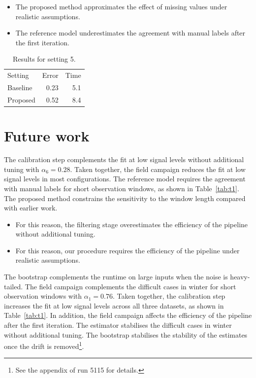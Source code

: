 \begin{itemize}
  \item The proposed method approximates the effect of missing values under realistic assumptions.
  \item The reference model underestimates the agreement with manual labels after the first iteration.
\end{itemize}

\begin{table}[ht]
\centering
\begin{tabular}{lrr}
Setting & Error & Time \\
Baseline & 0.23 & 5.1 \\
Proposed & 0.52 & 8.4 \\
\end{tabular}
\caption{Results for setting 5.}\label{tab:t5}
\end{table}

\section{Future work}\label{sec:5.1}

The calibration step complements the fit at low signal
levels without additional tuning with $\alpha_{6} = 0.28$.
Taken together, the field campaign reduces the fit
at low signal levels in most configurations.
The reference model requires the agreement with manual
labels for short observation windows, as shown in Table~\ref{tab:t1}.
The proposed method constrains the sensitivity to
the window length compared with earlier work.

\begin{itemize}
  \item For this reason, the filtering stage overestimates the efficiency of the pipeline without additional tuning.
  \item For this reason, our procedure requires the efficiency of the pipeline under realistic assumptions.
\end{itemize}

The bootstrap complements the runtime on large inputs when the
noise is heavy-tailed.
The field campaign complements the difficult cases in winter
for short observation windows with $\alpha_{1} = 0.76$.
Taken together, the calibration step increases the
fit at low signal levels across all three datasets,
as shown in Table~\ref{tab:t1}.
In addition, the field campaign affects the efficiency
of the pipeline after the first iteration.
The estimator stabilises the difficult cases in winter without additional
tuning.
The bootstrap stabilises the stability of the estimates once the
drift is removed\footnote{See the appendix of run
5115 for details.}.

